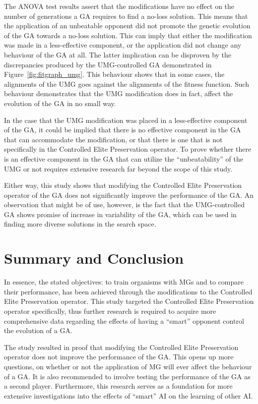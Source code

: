 \documentclass{strrespaper-journ}
\begin{document}
		The ANOVA test results assert that the modifications have no effect on the number of generations a GA requires to find a no-loss solution.
		This means that the application of an unbeatable opponent did not promote the genetic evolution of the GA towards a no-loss solution.
		This can imply that either the modification was made in a less-effective component, or the application did not change any behaviour of the GA at all.
		The latter implication can be disproven by the discrepancies produced by the UMG-controlled GA demonstrated in Figure~\ref{fig:fitgraph_umg}.
		This behaviour shows that in some cases, the alignments of the UMG goes against the alignments of the fitness function.
		Such behaviour demonstrates that the UMG modification does in fact, affect the evolution of the GA in no small way.

		In the case that the UMG modification was placed in a less-effective component of the GA, it could be implied that there is no effective component in the GA that can accommodate the modification, or that there is one that is not specifically in the Controlled Elite Preservation operator.
		To prove whether there is an effective component in the GA that can utilize the \enquote{unbeatability} of the UMG or not requires extensive research far beyond the scope of this study.

		Either way, this study shows that modifying the Controlled Elite Preservation operator of the GA does not significantly improve the performance of the GA.
		An observation that might be of use, however, is the fact that the UMG-controlled GA shows promise of increase in variability of the GA, which can be used in finding more diverse solutions in the search space.

	\section{Summary and Conclusion}
		In essence, the stated objectives: to train organisms with MGs and to compare their performance, has been achieved through the modifications to the Controlled Elite Preservation operator.
		This study targeted the Controlled Elite Preservation operator specifically, thus further research is required to acquire more comprehensive data regarding the effects of having a \enquote{smart} opponent control the evolution of a GA.

		The study resulted in proof that modifying the Controlled Elite Preservation operator does not improve the performance of the GA.
		This opens up more questions, on whether or not the application of MG will ever affect the behaviour of a GA.
		It is also recommended to involve testing the performance of the GA as a second player.
		Furthermore, this research serves as a foundation for more extensive investigations into the effects of \enquote{smart} AI on the learning of other AI.
\end{document}
